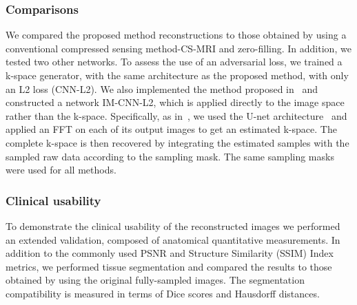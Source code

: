 \documentclass[10pt,journal,compsoc]{IEEEtran}
\begin{document}
\subsubsection*{\bf Comparisons}
We compared the proposed method reconstructions to those obtained by using a conventional compressed sensing method-CS-MRI \cite{lustig2007sparse} and zero-filling. In addition, we tested two other networks. To assess the use of an adversarial loss, we trained a k-space generator, with the same architecture as the proposed method, with only an L2 loss (CNN-L2). We also implemented the method proposed in~\cite{hyun2017deep} and constructed a network IM-CNN-L2, which is applied directly to the image space rather than the k-space. Specifically, as in~\cite{hyun2017deep}, we used the U-net architecture~\cite{ronneberger2015u} and applied an FFT on each of its output images to get an estimated k-space. The complete k-space is then recovered by integrating the estimated samples with the sampled raw data according to the sampling mask. The same sampling masks were used for all methods.

\subsubsection*{\bf Clinical usability}
To demonstrate the clinical usability of the reconstructed images we performed an extended validation, composed of anatomical quantitative measurements. In addition to the commonly used PSNR and Structure Similarity (SSIM) Index~\cite{wang2004image} metrics, we performed tissue segmentation and compared the results to those obtained by using the original fully-sampled images. The segmentation compatibility is measured in terms of Dice scores and Hausdorff distances.
\end{document}
